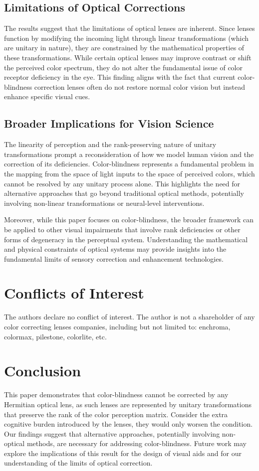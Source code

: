 \documentclass[10pt,a4paper]{article}
\theoremstyle{definition}
\theoremstyle{remark}
\numberwithin{equation}{section}
\begin{document}
\subsection{Limitations of Optical Corrections}
The results suggest that the limitations of optical lenses are inherent. Since lenses function by modifying the incoming light through linear transformations (which are unitary in nature), they are constrained by the mathematical properties of these transformations. While certain optical lenses may improve contrast or shift the perceived color spectrum, they do not alter the fundamental issue of color receptor deficiency in the eye. This finding aligns with the fact that current color-blindness correction lenses often do not restore normal color vision but instead enhance specific visual cues.

\subsection{Broader Implications for Vision Science}
The linearity of perception and the rank-preserving nature of unitary transformations prompt a reconsideration of how we model human vision and the correction of its deficiencies. Color-blindness represents a fundamental problem in the mapping from the space of light inputs to the space of perceived colors, which cannot be resolved by any unitary process alone. This highlights the need for alternative approaches that go beyond traditional optical methods, potentially involving non-linear transformations or neural-level interventions.

Moreover, while this paper focuses on color-blindness, the broader framework can be applied to other visual impairments that involve rank deficiencies or other forms of degeneracy in the perceptual system. Understanding the mathematical and physical constraints of optical systems may provide insights into the fundamental limits of sensory correction and enhancement technologies.


\section*{Conflicts of Interest}
The authors declare no conflict of interest. The author is not a shareholder of any color correcting lenses companies, including but not limited to: enchroma, colormax, pilestone, colorlite, etc. 



\section{Conclusion}
This paper demonstrates that color-blindness cannot be corrected by any Hermitian optical lens, as such lenses are represented by unitary transformations that preserve the rank of the color perception matrix. Consider the extra cognitive burden introduced by the lenses, they would only worsen the condition. Our findings suggest that alternative approaches, potentially involving non-optical methods, are necessary for addressing color-blindness. Future work may explore the implications of this result for the design of visual aids and for our understanding of the limits of optical correction.



\end{document}
